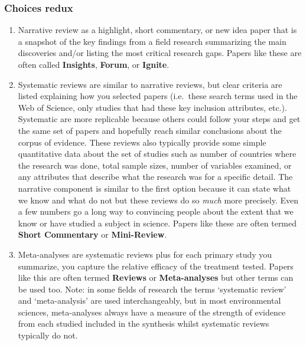 \documentclass[
]{book}
\begin{document}
\hypertarget{choices-redux}{%
\subsubsection*{Choices redux}\label{choices-redux}}

\begin{enumerate}
\def\labelenumi{(\arabic{enumi})}
\item
  Narrative review as a highlight, short commentary, or new idea paper that is a snapshot of the key findings from a field research summarizing the main discoveries and/or listing the most critical research gaps. Papers like these are often called \textbf{Insights}, \textbf{Forum}, or \textbf{Ignite}.
\item
  Systematic reviews are similar to narrative reviews, but clear criteria are listed explaining how you selected papers (i.e.~these search terms used in the Web of Science, only studies that had these key inclusion attributes, etc.). Systematic are more replicable because others could follow your steps and get the same set of papers and hopefully reach similar conclusions about the corpus of evidence. These reviews also typically provide some simple quantitative data about the set of studies such as number of countries where the research was done, total sample sizes, number of variables examined, or any attributes that describe what the research was for a specific detail. The narrative component is similar to the first option because it can state what we know and what do not but these reviews do so \emph{much} more precisely. Even a few numbers go a long way to convincing people about the extent that we know or have studied a subject in science. Papers like these are often termed \textbf{Short Commentary} or \textbf{Mini-Review}.
\item
  Meta-analyses are systematic reviews plus for each primary study you summarize, you capture the relative efficacy of the treatment tested. Papers like this are often termed \textbf{Reviews} or \textbf{Meta-analyses} but other terms can be used too. Note: in some fields of research the terms `systematic review' and `meta-analysis' are used interchangeably, but in most environmental sciences, meta-analyses always have a measure of the strength of evidence from each studied included in the synthesis whilst systematic reviews typically do not.
\end{enumerate}
\end{document}
